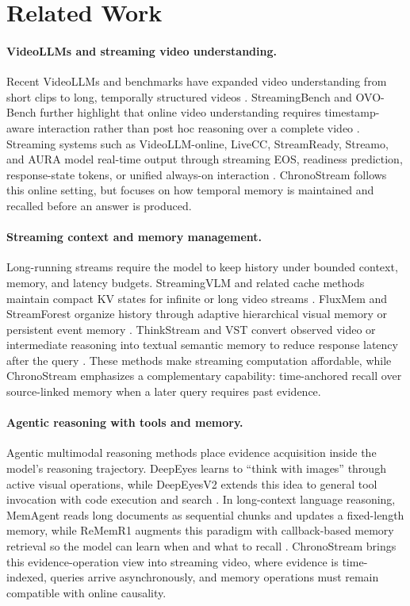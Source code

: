 \documentclass[11pt]{article}
\begin{document}
\section{Related Work}

\paragraph{VideoLLMs and streaming video understanding.}
Recent VideoLLMs and benchmarks have expanded video understanding from short clips to long, temporally structured videos \citep{mvbench2024,longvideobench2024,videomme2025}.
StreamingBench and OVO-Bench further highlight that online video understanding requires timestamp-aware interaction rather than post hoc reasoning over a complete video \citep{streamingbench2024,ovobench2025}.
Streaming systems such as VideoLLM-online, LiveCC, StreamReady, Streamo, and AURA model real-time output through streaming EOS, readiness prediction, response-state tokens, or unified always-on interaction \citep{videollm_online2024,livecc2025,streamready2026,streamo2026,aura2026}.
ChronoStream follows this online setting, but focuses on how temporal memory is maintained and recalled before an answer is produced.

\paragraph{Streaming context and memory management.}
Long-running streams require the model to keep history under bounded context, memory, and latency budgets.
StreamingVLM and related cache methods maintain compact KV states for infinite or long video streams \citep{streamingvlm2025}.
FluxMem and StreamForest organize history through adaptive hierarchical visual memory or persistent event memory \citep{fluxmem2026,streamforest2025}.
ThinkStream and VST convert observed video or intermediate reasoning into textual semantic memory to reduce response latency after the query \citep{thinkstream2026,vst2026}.
These methods make streaming computation affordable, while ChronoStream emphasizes a complementary capability: time-anchored recall over source-linked memory when a later query requires past evidence.

\paragraph{Agentic reasoning with tools and memory.}
Agentic multimodal reasoning methods place evidence acquisition inside the model's reasoning trajectory.
DeepEyes learns to ``think with images'' through active visual operations, while DeepEyesV2 extends this idea to general tool invocation with code execution and search \citep{deepeyes2026,deepeyesv22026}.
In long-context language reasoning, MemAgent reads long documents as sequential chunks and updates a fixed-length memory, while ReMemR1 augments this paradigm with callback-based memory retrieval so the model can learn when and what to recall \citep{memagent2025,rememr12026}.
ChronoStream brings this evidence-operation view into streaming video, where evidence is time-indexed, queries arrive asynchronously, and memory operations must remain compatible with online causality.
\end{document}
